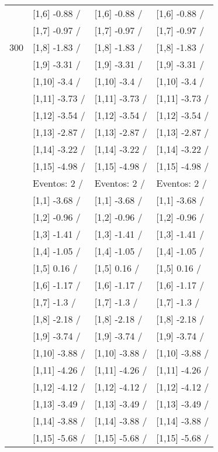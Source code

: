 \begin{table}
\begin{tabular}[t]{llll}
 & {}[1,6] -0.88  / & {}[1,6] -0.88  / & {}[1,6] -0.88  /\\
 & {}[1,7] -0.97  / & {}[1,7] -0.97  / & {}[1,7] -0.97  /\\
300 & {}[1,8] -1.83  / & {}[1,8] -1.83  / & {}[1,8] -1.83  /\\
\addlinespace
 & {}[1,9] -3.31  / & {}[1,9] -3.31  / & {}[1,9] -3.31  /\\
 & {}[1,10] -3.4  / & {}[1,10] -3.4  / & {}[1,10] -3.4  /\\
 & {}[1,11] -3.73  / & {}[1,11] -3.73  / & {}[1,11] -3.73  /\\
 & {}[1,12] -3.54  / & {}[1,12] -3.54  / & {}[1,12] -3.54  /\\
 & {}[1,13] -2.87  / & {}[1,13] -2.87  / & {}[1,13] -2.87  /\\
\addlinespace
 & {}[1,14] -3.22  / & {}[1,14] -3.22  / & {}[1,14] -3.22  /\\
 & {}[1,15] -4.98  / & {}[1,15] -4.98  / & {}[1,15] -4.98  /\\
 & Eventos:  2 / & Eventos:  2 / & Eventos:  2 /\\
 & {}[1,1] -3.68  / & {}[1,1] -3.68  / & {}[1,1] -3.68  /\\
 & {}[1,2] -0.96  / & {}[1,2] -0.96  / & {}[1,2] -0.96  /\\
\addlinespace
 & {}[1,3] -1.41  / & {}[1,3] -1.41  / & {}[1,3] -1.41  /\\
 & {}[1,4] -1.05  / & {}[1,4] -1.05  / & {}[1,4] -1.05  /\\
 & {}[1,5] 0.16  / & {}[1,5] 0.16  / & {}[1,5] 0.16  /\\
 & {}[1,6] -1.17  / & {}[1,6] -1.17  / & {}[1,6] -1.17  /\\
 & {}[1,7] -1.3  / & {}[1,7] -1.3  / & {}[1,7] -1.3  /\\
\addlinespace
500 & {}[1,8] -2.18  / & {}[1,8] -2.18  / & {}[1,8] -2.18  /\\
 & {}[1,9] -3.74  / & {}[1,9] -3.74  / & {}[1,9] -3.74  /\\
 & {}[1,10] -3.88  / & {}[1,10] -3.88  / & {}[1,10] -3.88  /\\
 & {}[1,11] -4.26  / & {}[1,11] -4.26  / & {}[1,11] -4.26  /\\
 & {}[1,12] -4.12  / & {}[1,12] -4.12  / & {}[1,12] -4.12  /\\
\addlinespace
 & {}[1,13] -3.49  / & {}[1,13] -3.49  / & {}[1,13] -3.49  /\\
 & {}[1,14] -3.88  / & {}[1,14] -3.88  / & {}[1,14] -3.88  /\\
 & {}[1,15] -5.68  / & {}[1,15] -5.68  / & {}[1,15] -5.68  /\\
\bottomrule
\end{tabular}
\end{table}
